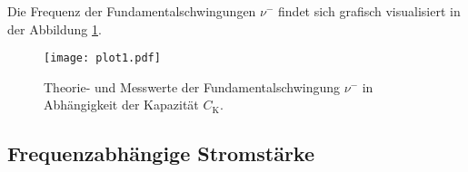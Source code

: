 Die Frequenz der Fundamentalschwingungen $\nu^-$ findet sich grafisch visualisiert in der
Abbildung \ref{fig:plot1}.
\begin{figure} [H]
    \centering
    \texttt{[image: plot1.pdf]}
    \caption{Theorie- und Messwerte der Fundamentalschwingung $\nu^-$ in Abhängigkeit
    der Kapazität ${C_\text{K}}$.}
    \label{fig:plot1}
\end{figure}


\subsection{Frequenzabhängige Stromstärke}
